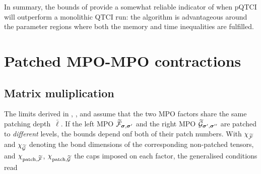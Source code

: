 In summary, the bounds of  provide a somewhat reliable
indicator of when pQTCI will outperform a monolithic QTCI run: the algorithm is advantageous around the parameter regions where both the memory and time inequalities are fulfilled.

\section{Patched MPO-MPO contractions}
\label{sec:PatchContrbounds}
\subsection{Matrix muliplication}
The limits derived in , , and  assume that the
two MPO factors share the same patching depth~\(\bar\ell\).  If the left MPO \(\widetilde{\mathcal{F}}_{\boldsymbol{\sigma},\boldsymbol{\sigma}'}\) and the right MPO
\(\widetilde{\mathcal{G}}_{\boldsymbol{\sigma}',\boldsymbol{\sigma}''}\) are patched to \emph{different} levels, the bounds depend onf both of their patch numbers. With \(\chi_{\widetilde{\mathcal{F}}}\) and \(\chi_{\widetilde{\mathcal{G}}}\) denoting the bond dimensions of the corresponding non-patched tensors, and \(\chi_{\text{patch},\widetilde{\mathcal{F}}}\), \(\chi_{\text{patch},\widetilde{\mathcal{G}}}\) the caps imposed on each factor, the generalised conditions read

